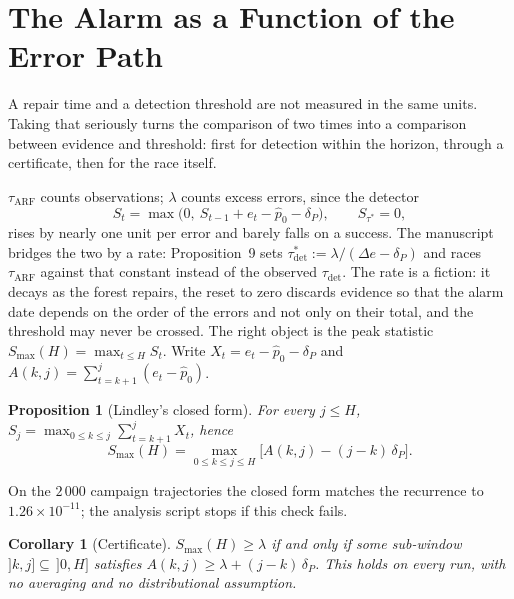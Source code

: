 \documentclass[10pt,conference]{IEEEtran}
\newtheorem{proposition}[theorem]{Proposition}
\newtheorem{corollary}[theorem]{Corollary}
\theoremstyle{definition}
\begin{document}
\section{The Alarm as a Function of the Error Path}
\label{sec:certificate}

A repair time and a detection threshold are not measured in the same units. Taking that
seriously turns the comparison of two times into a comparison between evidence and threshold: first for
detection within the horizon, through a certificate, then for the race itself.

$\tau_{\mathrm{ARF}}$ counts observations; $\lambda$ counts excess errors, since the
detector
\begin{equation}
  S_t = \max\big(0,\ S_{t-1} + e_t - \hat p_0 - \delta_P\big), \qquad S_{\tau^*} = 0,
  \label{eq:cusum}
\end{equation}
rises by nearly one unit per error and barely falls on a success. The manuscript bridges
the two by a rate: Proposition~9 sets $\tau^*_{\mathrm{det}} := \lambda/(\Delta e - \delta_P)$
and races $\tau_{\mathrm{ARF}}$ against that constant instead of the observed
$\tau_{\mathrm{det}}$. The rate is a fiction: it decays as the forest repairs, the reset to
zero discards evidence so that the alarm date depends on the order of the errors and not
only on their total, and the threshold may never be crossed. The right object is the peak
statistic $S_{\max}(H) = \max_{t \le H} S_t$. Write
$X_t = e_t - \hat p_0 - \delta_P$ and $A(k,j) = \sum_{t=k+1}^{j} (e_t - \hat p_0)$.

\begin{proposition}[Lindley's closed form]\label{prop:lindley}
For every $j \le H$, $S_j = \max_{0 \le k \le j} \sum_{t=k+1}^{j} X_t$, hence
\[
  S_{\max}(H) = \max_{0 \le k \le j \le H} \big[A(k,j) - (j-k)\,\delta_P\big].
\]
\end{proposition}

On the $2\,000$ campaign trajectories the closed form matches the recurrence to
$1.26 \times 10^{-11}$; the analysis script stops if this check fails.

\begin{corollary}[Certificate]\label{cor:certificate}
$S_{\max}(H) \ge \lambda$ if and only if some sub-window $]k,j] \subseteq\, ]0,H]$
satisfies $A(k,j) \ge \lambda + (j-k)\,\delta_P$. This holds on every run, with no averaging
and no distributional assumption.
\end{corollary}
\end{document}
